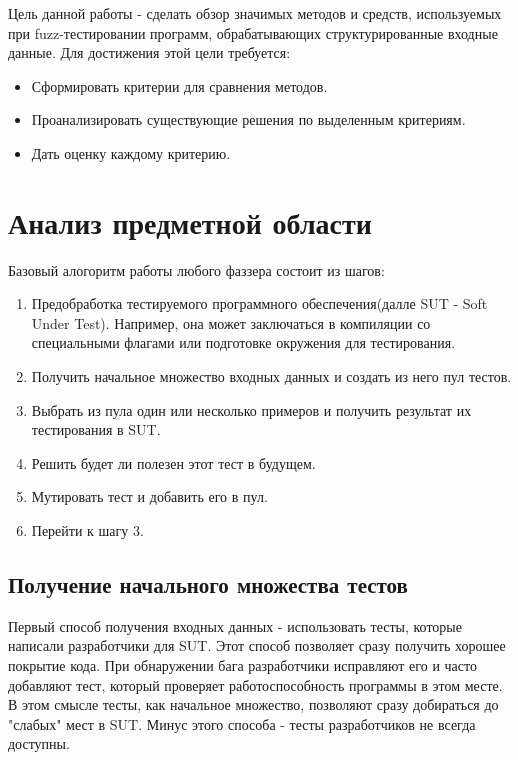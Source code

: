 \documentclass[a4paper]{article}
\begin{document}
Цель данной работы - сделать обзор значимых методов и средств, используемых при fuzz-тестировании программ, обрабатывающих структурированные входные данные. Для достижения этой цели требуется:

\begin{itemize}
\item Сформировать критерии для сравнения методов.
\item Проанализировать существующие решения по выделенным критериям.
\item Дать оценку каждому критерию.
\end{itemize}

\newpage
\section{Анализ предметной области}
\indent
 
Базовый алогоритм работы любого фаззера состоит из шагов:

\begin{enumerate}
    \item Предобработка тестируемого программного обеспечения(далле SUT - Soft Under Test). Например, она может заключаться в компиляции со специальными флагами или подготовке окружения для тестирования. 
    \item Получить начальное множество входных данных и создать из него пул тестов.
    \item Выбрать из пула один или несколько примеров и получить результат их тестирования в SUT.
    \item Решить будет ли полезен этот тест в будущем.
    \item Мутировать тест и добавить его в пул.
    \item Перейти к шагу 3.
\end{enumerate}

\subsection{Получение начального множества тестов}
\indent

Первый способ получения входных данных - использовать тесты, которые написали разработчики для SUT. Этот способ позволяет сразу получить хорошее покрытие кода. При обнаружении бага разработчики исправляют его и часто добавляют тест, который проверяет работоспособность программы в этом месте. В этом смысле тесты, как начальное множество, позволяют сразу добираться до "слабых" мест в SUT. Минус этого способа - тесты разработчиков не всегда доступны.
\indent
\end{document}
